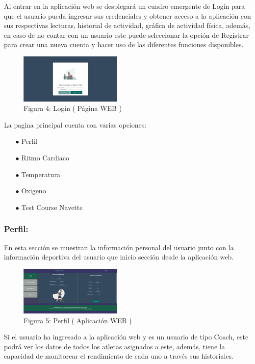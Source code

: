 \documentclass[osajnl,twocolumn,showpacs,superscriptaddress,10pt]{revtex4-1}
\begin{document}
    Al entrar en la aplicación web se desplegará un cuadro emergente de Login para que el usuario pueda ingresar sus credenciales y obtener acceso a la aplicación con sus respectivas lecturas, historial de actividad, gráfica de actividad física, además, en caso de no contar con un usuario este puede seleccionar la opción de Registrar para crear una nueva cuenta y hacer uso de las diferentes funciones disponibles.
    
\begin{figure} [H] \centering 
\caption{Figura 4: Login ( Página WEB )}
\includegraphics[width=0.45\textwidth]{Login.PNG}
\end{figure}

La pagina principal cuenta con varias opciones:
\begin{itemize}
    \item[$\bullet$]Perfil 
    \item[$\bullet$]Ritmo Cardiaco
    \item[$\bullet$]Temperatura
    \item[$\bullet$]Oxigeno
    \item[$\bullet$]Test Course Navette 
\end{itemize}

\subsubsection{Perfil:}
    En esta sección se muestran la información personal del usuario junto con la información deportiva del usuario que inicio sección desde la aplicación web.
    
\begin{figure} [H] \centering 
\caption{Figura 5: Perfil ( Aplicación WEB )}
\includegraphics[width=0.45\textwidth]{Perfil.PNG}
\end{figure}

    Si el usuario ha ingresado a la aplicación web y es un usuario de tipo Coach, este podrá ver los datos de todos los atletas asignados a este, además, tiene la capacidad de monitorear el rendimiento de cada uno a través sus historiales.
    
\end{document}
